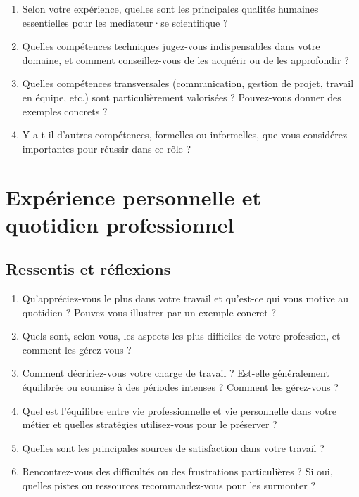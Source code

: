 \documentclass[a4paper,11pt]{article}
\begin{document}
\begin{enumerate}[leftmargin=*]
    \item Selon votre expérience, quelles sont les principales qualités humaines essentielles pour les mediateur·se scientifique ?

    \item Quelles compétences techniques jugez-vous indispensables dans votre domaine, et comment conseillez-vous de les acquérir ou de les approfondir ?

    \item Quelles compétences transversales (communication, gestion de projet, travail en équipe, etc.) sont particulièrement valorisées ? Pouvez-vous donner des exemples concrets ?

    \item Y a-t-il d'autres compétences, formelles ou informelles, que vous considérez importantes pour réussir dans ce rôle ?
\end{enumerate}

\section{Expérience personnelle et quotidien professionnel}

\subsection{Ressentis et réflexions}

\begin{enumerate}[leftmargin=*]
    \item Qu'appréciez-vous le plus dans votre travail et qu'est-ce qui vous motive au quotidien ? Pouvez-vous illustrer par un exemple concret ?

    \item Quels sont, selon vous, les aspects les plus difficiles de votre profession, et comment les gérez-vous ?

    \item Comment décririez-vous votre charge de travail ? Est-elle généralement équilibrée ou soumise à des périodes intenses ? Comment les gérez-vous ?
    
    \item Quel est l'équilibre entre vie professionnelle et vie personnelle dans votre métier et quelles stratégies utilisez-vous pour le préserver ?
    
    \item Quelles sont les principales sources de satisfaction dans votre travail ?
    
    \item Rencontrez-vous des difficultés ou des frustrations particulières ? Si oui, quelles pistes ou ressources recommandez-vous pour les surmonter ?
\end{enumerate}
\end{document}
